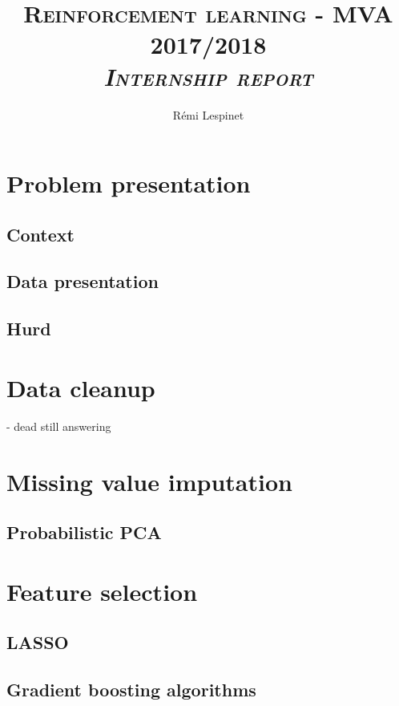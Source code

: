 \documentclass[a4paper, 11pt]{article}
\title{\textsc{Reinforcement learning - MVA 2017/2018 \\ \emph{Internship report}} }
\author{Rémi Lespinet}
\date{}
\begin{document}
\maketitle
\thispagestyle{fancy}



\section{Problem presentation}

\subsection{Context}

\subsection{Data presentation}

\subsection{Hurd}

\section{Data cleanup}

- dead still answering

\section{Missing value imputation}

\subsection{Probabilistic PCA}

\section{Feature selection}

\subsection{LASSO}

\subsection{Gradient boosting algorithms}
\end{document}
